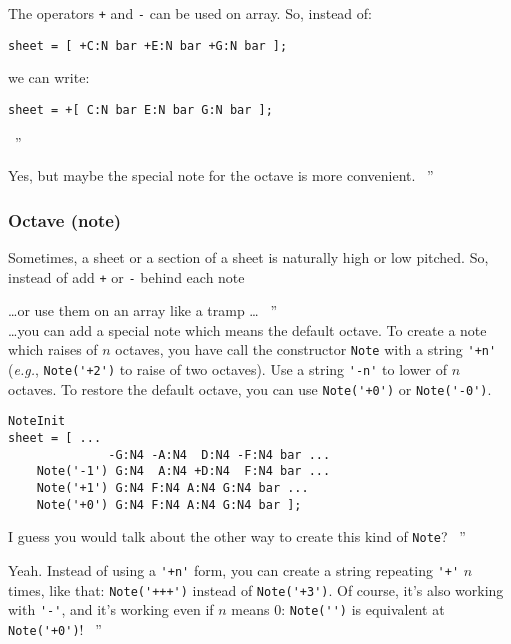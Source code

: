 \documentclass{article}
\newcommand\eg{\emph{e.g.}\xspace}
\newenvironment{meenv}{ \par \noindent \makebox[6em][r]{ \textcolor{mecolor}{Me}: `` --~}}{~''}
\newenvironment{myselfenv}{ \par \noindent \makebox[6em][r]{ \textcolor{myselfcolor}{Myself}: `` --~}}{~''}
\newcommand{ \me }[1]{%
\begin{meenv}%
	#1%
\end{meenv} }
\newcommand{ \myself }[1]{%
\begin{myselfenv}%
	#1%
\end{myselfenv} }
\begin{document}
\begin{meenv}%
The operators \lstinline!+! and \lstinline!-! can be used on array. So, instead of:
\begin{lstlisting}
sheet = [ +C:N bar +E:N bar +G:N bar ];
\end{lstlisting}
we can write:
\begin{lstlisting}
sheet = +[ C:N bar E:N bar G:N bar ];
\end{lstlisting}%
\end{meenv}
\myself{Yes, but maybe the special note for the octave is more convenient.}

\subsubsection{Octave (note)}
\label{sec:OctaveNote}

Sometimes, a sheet or a section of a sheet is naturally high or low pitched. So, instead of add \lstinline!+! or \lstinline!-! behind each note
\myself{\dots or use them on an array like a tramp \dots} \\
\dots you can add a special note which means the default octave. To create a note which raises of $n$ octaves, you have call the constructor \lstinline!Note! with a string \lstinline!'+n'! (\eg, \lstinline!Note('+2')! to raise of two octaves). Use a string \lstinline!'-n'! to lower of $n$ octaves. To restore the default octave, you can use \lstinline!Note('+0')! or \lstinline!Note('-0')!. \\

\begin{lstlisting}
NoteInit
sheet = [ ...
	          -G:N4 -A:N4  D:N4 -F:N4 bar ...
	Note('-1') G:N4  A:N4 +D:N4  F:N4 bar ...
	Note('+1') G:N4 F:N4 A:N4 G:N4 bar ...
	Note('+0') G:N4 F:N4 A:N4 G:N4 bar ];
\end{lstlisting}

\myself{I guess you would talk about the other way to create this kind of \lstinline!Note!?}
\me{Yeah. Instead of using a \lstinline!'+n'! form, you can create a string repeating \lstinline!'+'! $n$ times, like that: \lstinline!Note('+++')! instead of \lstinline!Note('+3')!. Of course, it's also working with \lstinline!'-'!, and it's working even if $n$ means $0$: \lstinline!Note('')! is equivalent at \lstinline!Note('+0')!!}
\end{document}
